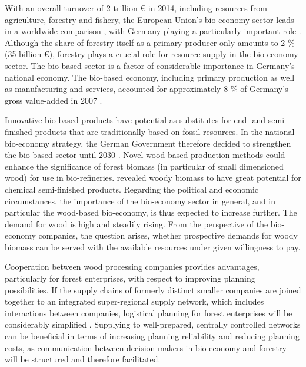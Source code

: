 With an overall turnover of 2 trillion {\euro} in 2014, including resources from agriculture, forestry and fishery, the European Union's bio-economy sector leads in a worldwide comparison \citep[p. 221, 223]{elchichakli_2016}, with Germany playing a particularly important role \citep[p. 200]{hennig_2016}. Although the share of forestry itself as a primary producer only amounts to 2 \% (35 billion {\euro}), forestry plays a crucial role for resource supply in the bio-economy sector. The bio-based sector is a factor of considerable importance in Germany's national economy. The bio-based economy, including primary production as well as manufacturing and services, accounted for approximately 8 \% of Germany's gross value-added in 2007 \citep[p. 29-30]{efken_2012}.

Innovative bio-based products have potential as substitutes for end- and semi-finished products that are traditionally based on fossil resources. In the national bio-economy strategy, the German Government therefore decided to strengthen the bio-based sector until 2030 \citep[p. 15-16]{bmel_2014b}. Novel wood-based production methods could enhance the significance of forest biomass (in particular of small dimensioned wood) for use in bio-refineries. \citet[p. 49]{ekman_2013} revealed woody biomass to have great potential for chemical semi-finished products. Regarding the political and economic circumstances, the importance of the bio-economy sector in general, and in particular the wood-based bio-economy, is thus expected to increase further. The demand for wood is high and steadily rising. From the perspective of the bio-economy companies, the question arises, whether prospective demands for woody biomass can be served with the available resources under given willingness to pay.

Cooperation between wood processing companies provides advantages, particularly for forest enterprises, with respect to improving planning possibilities. If the supply chains of formerly distinct smaller companies are joined together to an integrated super-regional supply network, which includes interactions between companies, logistical planning for forest enterprises will be considerably simplified \citep[p. 3]{geldermann_2016}. Supplying to well-prepared, centrally controlled networks can be beneficial in terms of increasing planning reliability and reducing planning costs, as communication between decision makers in bio-economy and forestry will be structured and therefore facilitated.

